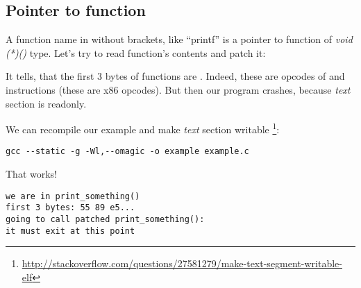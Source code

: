 \subsection{Pointer to function}

A function name in \CCpp without brackets, like ``printf'' is a pointer to function of \emph{void (*)()} type.
Let's try to read function's contents and patch it:



It tells, that the first 3 bytes of functions are .
Indeed, these are opcodes of  and  instructions (these are x86 opcodes).
But then our program crashes, because \emph{text} section is readonly.

We can recompile our example and make \emph{text} section writable
\footnote{\url{http://stackoverflow.com/questions/27581279/make-text-segment-writable-elf}}:

\begin{lstlisting}
gcc --static -g -Wl,--omagic -o example example.c
\end{lstlisting}

That works!

\begin{lstlisting}
we are in print_something()
first 3 bytes: 55 89 e5...
going to call patched print_something():
it must exit at this point
\end{lstlisting}

